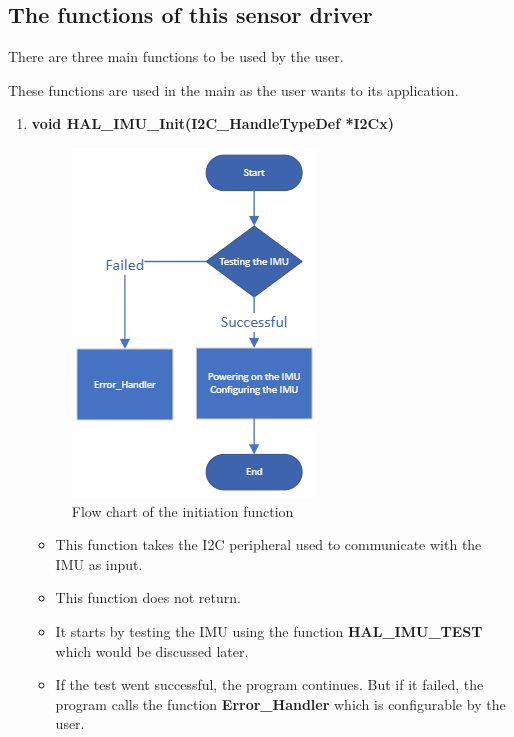 \subsection{The functions of this sensor driver}
There are three main functions to be used by the user.
\clearpage
These functions are used in the main as the user wants to its application.
\begin{enumerate}
    \item \textbf{void HAL\_IMU\_Init(I2C\_HandleTypeDef *I2Cx)}
    \begin{figure}[h]
        \centering
        \includegraphics{figure/5-3.png}
        \caption{Flow chart of the initiation function}
    \end{figure}
    \begin{itemize}
    \item This function takes the I2C peripheral used to communicate with the IMU as input.
    \item This function does not return.
    \item It starts by testing the IMU using the function \textbf{HAL\_IMU\_TEST} which would be discussed later.
    \item If the test went successful, the program continues. But if it failed, the program calls the function \textbf{Error\_Handler} which is configurable by the user.

\end{itemize}
\end{enumerate}
